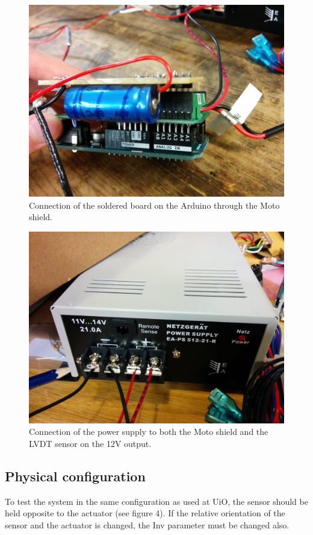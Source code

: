 \documentclass[pdftex,a4paper,12pt,onecolumn,fleqn,captions=tableheading]{scrartcl}
\begin{document}
\begin{figure}
\begin{center}
\includegraphics[width=.49\textwidth]{Figures/IMG_20150928_140626}
\caption{Connection of the soldered board on the Arduino through the Moto shield.}
\end{center}
\end{figure}

\begin{figure}
\begin{center}
\includegraphics[width=.49\textwidth]{Figures/IMG_20150924_132227}
\caption{Connection of the power supply to both the Moto shield and the LVDT sensor on the 12V output.}
\end{center}
\end{figure}

\subsection{Physical configuration}

To test the system in the same configuration as used at UiO, the sensor should be held opposite to the actuator (see figure 4). If the relative orientation of the sensor and the actuator is changed, the Inv parameter must be changed also.
\end{document}
